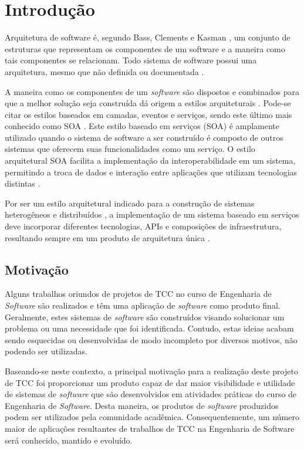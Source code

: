 \chapter[Introdução]{Introdução}
Arquitetura de software é, segundo Bass, Clements e Kasman \cite{bass_software_archi_practice_2003}, um conjunto de estruturas que representam os componentes de um software e a maneira como tais componentes se relacionam. Todo sistema de software possui uma arquitetura, mesmo que não definida ou documentada \cite{bass_software_archi_practice_2003}.

A maneira como os componentes de um \textit{software} são dispostos e combinados para que a melhor solução seja construída dá origem a estilos arquiteturais \cite{pressman2006engenharia}. Pode-se citar os estilos baseados em camadas, eventos e serviços, sendo este último mais conhecido como SOA \cite{josuttis_soa_2007}. Este estilo baseado em serviços (SOA) é amplamente utilizado quando o sistema de software a ser construído é composto de outros sistemas que oferecem suas funcionalidades como um serviço. O estilo arquitetural SOA facilita a implementação da interoperabilidade em um sistema, permitindo a troca de dados e interação entre aplicações que utilizam tecnologias distintas \cite{oqueesoa_2010}.

Por ser um estilo arquitetural indicado para a construção de sistemas heterogêneos e distribuídos \cite{josuttis_soa_2007}, a implementação de um sistema baseado em serviços deve incorporar diferentes tecnologias, APIs e composições de infraestrutura, resultando sempre em um produto de arquitetura única \cite{erl_orientacaoaservico_2009}.

\section{Motivação}
Alguns trabalhos oriundos de projetos de TCC no curso de Engenharia de \textit{Software} são realizados e têm uma aplicação de \textit{software} como produto final. Geralmente, estes sistemas de \textit{software} são construídos visando solucionar um problema ou uma necessidade que foi identificada. Contudo, estas ideias acabam sendo esquecidas ou desenvolvidas de modo incompleto por diversos motivos, não podendo ser utilizadas.

Baseando-se neste contexto, a principal motivação para a realização deste projeto de TCC foi proporcionar um produto capaz de dar maior visibilidade e utilidade de sistemas de \textit{software} que são desenvolvidos em atividades práticas do curso de Engenharia de \textit{Software}. Desta maneira, os produtos de \textit{software} produzidos podem ser utilizados pela comunidade acadêmica. Consequentemente, um número maior de aplicações resultantes de trabalhos de TCC na Engenharia de Software será conhecido, mantido e evoluído. 

